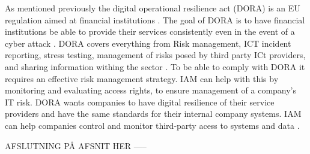 As mentioned previously the digital operational resilience act (DORA) is an EU regulation aimed at financial institutions \citep{DoraIAM:}. The goal of DORA is to have financial institutions be able to provide their services consistently even in the event of a cyber attack \citep{DoraIAM:}. DORA covers everything from Risk management, ICT incident reporting, stress testing, management of risks posed by third party ICt providers, and sharing information withing the sector \citep{Dora}. To be able to comply with DORA it requires an effective risk management strategy. IAM can help with this by monitoring and evaluating access rights, to ensure management of a company's IT risk. DORA wants companies to have digital resilience of their service providers and have the same standards for their internal company systems. IAM can help companies control and monitor third-party acess to systems and data \citep{DoraIAM:}.




AFSLUTNING PÅ AFSNIT HER -----
